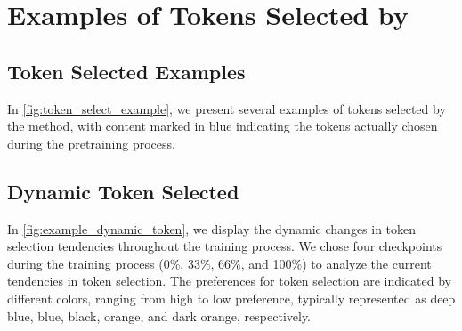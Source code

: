 \section{Examples of Tokens Selected by \method{}}

\subsection{Token Selected Examples}
\label{sec:appendix:examples_token_selected}


In \autoref{fig:token_select_example}, we present several examples of tokens selected by the \method{} method, with content marked in \textcolor[RGB]{30,144,255}{blue} indicating the tokens actually chosen during the pretraining process.

\subsection{Dynamic Token Selected}
\label{sec:appendix:dynamic_token_selected}


In \autoref{fig:example_dynamic_token}, we display the dynamic changes in token selection tendencies throughout the \method{} training process. We chose four checkpoints during the training process (0\%, 33\%, 66\%, and 100\%) to analyze the current tendencies in token selection. The preferences for token selection are indicated by different colors, ranging from high to low preference, typically represented as \textcolor[RGB]{0,0,255}{deep blue}, \textcolor[RGB]{30,144,255}{blue}, black, \textcolor[RGB]{255,180,150}{orange}, and \textcolor[RGB]{255,100,0}{dark orange}, respectively.


